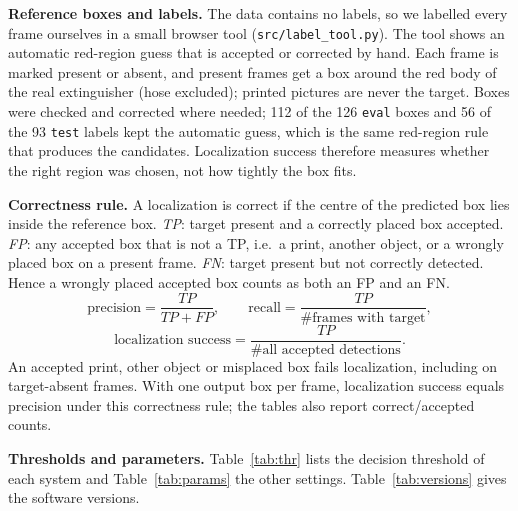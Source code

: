 \documentclass[11pt,a4paper]{article}
\begin{document}
\textbf{Reference boxes and labels.} The data contains no labels, so we labelled every frame ourselves in a small browser tool (\texttt{src/label\_tool.py}).
The tool shows an automatic red-region guess that is accepted or corrected by hand. Each frame is marked present or absent, and present frames get a box around the red body of the real extinguisher (hose excluded);
printed pictures are never the target. Boxes were checked and corrected where needed; 112 of the 126 \texttt{eval} boxes and 56 of the 93 \texttt{test} labels kept the automatic guess, which is the same red-region rule that produces the candidates. Localization success therefore measures whether the right region was chosen, not how tightly the box fits.

\textbf{Correctness rule.} A localization is correct if the centre of the predicted box lies inside the reference box.
\emph{TP}: target present and a correctly placed box accepted. \emph{FP}: any accepted box that is not a TP, i.e.\ a print, another object, or a wrongly placed box on a present frame.
\emph{FN}: target present but not correctly detected. Hence a wrongly placed accepted box counts as both an FP and an FN.
\[\text{precision}=\frac{TP}{TP+FP},\qquad \text{recall}=\frac{TP}{\#\text{frames with target}},\]
\[\text{localization success}=\frac{TP}{\#\text{all accepted detections}}.\]
An accepted print, other object or misplaced box fails localization, including on target-absent frames. With one output box per frame, localization success equals precision under this correctness rule; the tables also report correct/accepted counts.

\textbf{Thresholds and parameters.} Table~\ref{tab:thr} lists the decision threshold of each system and Table~\ref{tab:params} the other settings.
Table~\ref{tab:versions} gives the software versions.

\begin{table}[htbp]\centering\small

\caption{Decision threshold and cue handling of each system, chosen on \texttt{test}. The SIFT threshold is 0: without cues no threshold reaches a precision of 0.75, so the rule falls back to the best F1, which lies at 0; with cues a precision of 0.95 is already reached at 0, so the highest-recall rule stops there. The SIFT score threshold therefore rejects no surviving candidate. Frames with no candidates, or with all candidates vetoed by cues, are still rejected. For system 7 every candidate scores 1 and a threshold of 1 with penalty 0.05 is the same as a veto.}\label{tab:thr}
\end{table}
\end{document}
